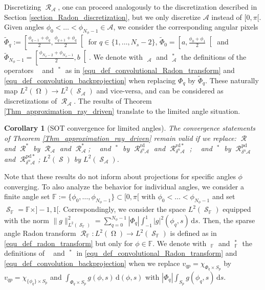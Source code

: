 \documentclass[11pt,reqno]{amsart}
\newcommand{\sumphi}{\sum_{q=0}^{N_\phi-1}}
\DeclareMathOperator{\Radon}{\mathcal{R}}
\DeclareMathOperator{\GenRadon}{\mathcal{R}^\omega_{\delta}}
\DeclareMathOperator{\RayRadonN}{\mathcal{R}^\mathrm{rd}_{\delta^n}}
\DeclareMathOperator{\PixelRadonN}{\mathcal{R}^\mathrm{pd}_{\delta^n}}
\DeclareMathOperator{\imgdom}{\Omega}
\DeclareMathOperator{\sinodom}{\mathcal{S}}
\newcommand{\dd}[1]{\,\mathrm{d}{#1}}
\numberwithin{theorem}{section}
\newtheorem{corollary}[theorem]{Corollary}
\theoremstyle{remark}
\begin{document}
Discretizing $\Radon_\mathcal{A}$, one can proceed analogously to the discretization described in Section \ref{section_Radon_discretization}, but we only discretize $\mathcal{A}$ instead of $[0,\pi[$.
Given angles $\phi_0<\dots<\phi_{N_\phi-1} \in \mathcal{A}$, we consider the corresponding angular pixels $\widetilde \Phi_q :=\left[\frac{\phi_{q-1}+\phi_q}{2},\frac{\phi_{q+1}+\phi_q}{2}\right[$ for $q\in \{1,\dots,N_s-2\}$, $ \widetilde \Phi_0=\left[a,\frac{\phi_{0}+\phi_1}{2}\right[$ and $\widetilde \Phi_{N_\phi-1}= \left[\frac{\phi_{N_\phi-2}+\phi_{N_\phi-1}}{2},b\right[$. 
We denote with $\GenRadon_\mathcal{A}$ and $\GenRadon_\mathcal{A}^*$ the definitions of the operators $\GenRadon$ and $\GenRadon^*$ as in \eqref{equ_def_convolutional_Radon_transform} and \eqref{equ_def_convolution_backprojection} when replacing $\Phi_q$ by $\widetilde \Phi_q$. These naturally map $L^2(\imgdom)\to L^2(\sinodom_\mathcal{A})$ and vice-versa, and can be considered as discretizations of $\Radon_\mathcal{A}$. 
The results of Theorem \ref{Thm_approximation_ray_driven} translate to the limited angle situation.
\begin{corollary}[SOT convergence for limited angles]
\label{Cor_limited_angle}
The convergence statements of Theorem \ref{Thm_approximation_ray_driven} remain valid if we replace:
$\Radon$ and $\Radon^*$ by $\Radon_\mathcal{A}$ and $\Radon_\mathcal{A}^*$; $\RayRadonN$ and $\RayRadonN^*$ by $\Radon_{\delta^n \mathcal{A}}^\mathrm{rd}$ and $\Radon_{\delta^n \mathcal{A}}^\mathrm{rd*}$ ; $\PixelRadonN$ and $\PixelRadonN^*$ by $\Radon_{\delta^n \mathcal{A}}^\mathrm{pd}$ and $\Radon_{\delta^n \mathcal{A}}^\mathrm{pd*}$; $L^2(\sinodom)$ by $L^2(\sinodom_\mathcal{A})$.
\end{corollary}

Note that these results do not inform about projections for specific angles $\phi$ converging. To also analyze the behavior for individual angles, we 
consider a finite angle set $\mathbb{F}:=\{\phi_0,\dots,\phi_{N_\phi-1}\}\subset [0,\pi[$ with $\phi_0< \dots< \phi_{N_\phi-1}$  and set $\sinodom_\mathbb{F} = \mathbb{F}\times ]-1,1[$. Correspondingly, we consider the space $L^2(\sinodom_\mathbb{F})$ equipped with the norm $\|g\|_{L^2(\sinodom_\mathbb{F})}^2 = \sumphi |\Phi_q| \int_{-1}^1 |g|^2(\phi_q,s) \dd s$.
Then, the sparse angle Radon transform $\Radon_\mathbb{F}\colon L^2(\imgdom) \to L^2(\sinodom_\mathbb{F})$ is defined as in \eqref{equ_def_radon_transform} but only for $\phi \in \mathbb{F}$.
We denote with $\GenRadon_{\mathbb{F}}$ and $\GenRadon_{\mathbb{F}}^*$ the definitions of $\GenRadon$ and $\GenRadon^*$ in \eqref{equ_def_convolutional_Radon_transform} and \eqref{equ_def_convolution_backprojection} when we replace $v_{qp}=\chi_{\Phi_q\times S_p}$ by $v_{qp}=\chi_{ \{\phi_q\}\times S_p}$ and $\int_{\Phi_q\times S_p} g (\phi,s) \dd {(\phi,s)}$ with $|\Phi_q| \int_{S_p} g (\phi_q,s)\dd s$.
\end{document}
